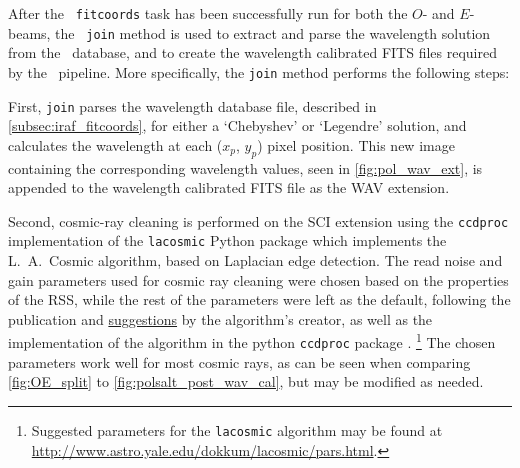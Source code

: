 After the \iraf\ \texttt{fitcoords} task has been successfully run for both the $O$- and $E$-beams, the \stops\ \texttt{join} method is used to extract and parse the wavelength solution from the \iraf\ database, and to create the wavelength calibrated \gls{FITS} files required by the \polsalt\ pipeline.
More specifically, the \texttt{join} method performs the following steps:

First, \texttt{join} parses the wavelength database file, described in \autoref{subsec:iraf_fitcoords}, for either a `Chebyshev' or `Legendre' solution, and calculates the wavelength at each ($x_{p}$, $y_{p}$) pixel position.
This new image containing the corresponding wavelength values, seen in \autoref{fig:pol_wav_ext}, is appended to the wavelength calibrated \gls{FITS} file as the \gls{WAV} extension.

\pagebreak

Second, cosmic-ray cleaning is performed on the \gls{SCI} extension using the \texttt{ccdproc} implementation of the \texttt{lacosmic} Python package which implements the L.~A.~Cosmic algorithm, based on Laplacian edge detection.
The read noise and gain parameters used for cosmic ray cleaning were chosen based on the properties of the \gls{RSS}, while the rest of the parameters were left as the default, following the publication and \href{http://www.astro.yale.edu/dokkum/lacosmic/pars.html}{suggestions} by the algorithm's creator, as well as the implementation of the algorithm in the python \texttt{ccdproc} package \citep{lacosmic,astroscrappy}.%
\footnote{Suggested parameters for the \texttt{lacosmic} algorithm may be found at \url{http://www.astro.yale.edu/dokkum/lacosmic/pars.html}.}
The chosen parameters work well for most cosmic rays, as can be seen when comparing \autoref{fig:OE_split} to \autoref{fig:polsalt_post_wav_cal}, but may be modified as needed.

